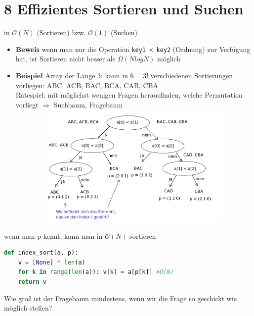 \documentclass[11pt, fleqn]{scrreprt}
\begin{document}
\chapter*{8 Effizientes Sortieren und Suchen}
in $\mathcal{O}(N)$ (Sortieren) bzw. $\mathcal{O}(1)$ (Suchen) \\
\begin{itemize}[label={}]
	\item \textbf{Beweis} wenn man nur die Operation \verb|key1 < key2| (Ordnung) zur Verfügung hat, ist Sortieren nicht besser als $\Omega (NlogN)$ möglich 
	\item \textbf{Beispiel} Array der Länge 3: kann in $ 6 = 3!$ verschiedenen Sortierungen vorliegen: ABC, ACB, BAC, BCA, CAB, CBA \\
	Ratespiel: mit möglichst wenigen Fragen herausfinden, welche Permutation vorliegt $\Rightarrow$ Suchbaum, Fragebaum \\
	\includegraphics[width=16cm,height=6cm,keepaspectratio]{./Pictures/Fragebaum.png}
\end{itemize}
wenn man p kennt, kann man in $\mathcal{O}(N)$ sortieren
\begin{lstlisting}[language=Python]
def index_sort(a, p):
	v = [None] * len(a)
	for k in range(len(a)):	v[k] = a[p[k]] #O(N)
	return v
\end{lstlisting}
\vspace*{0.5cm}
Wie groß ist der Fragebaum mindestens, wenn wir die Frage so geschickt wie möglich stellen?
\end{document}

